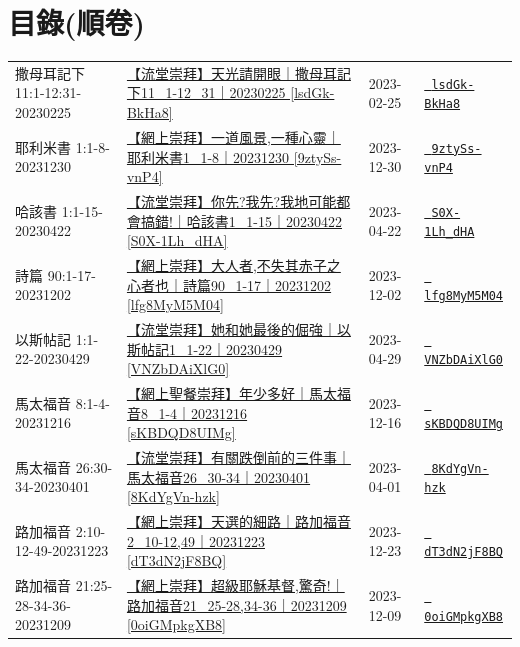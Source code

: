 \documentclass{book}
\begin{document}
\section{目錄\small{(順卷)}}
\label{sec:index_scriptual}
{ \scriptsize


\begin{xltabular}{\textwidth}{|p{0.15\textwidth} p{0.6\textwidth}|p{0.07\textwidth} p{0.1\textwidth}|}
\hline
撒母耳記下 11:1-12:31-20230225 & \hyperref[sec:lsdGk_BkHa8]{【流堂崇拜】天光請開眼｜撒母耳記下11\_1-12\_31｜20230225 [lsdGk-BkHa8]} & 2023-02-25 & \href{https://youtube.com/watch?v=lsdGk-BkHa8}{\texttt{ lsdGk-BkHa8}} \\
耶利米書 1:1-8-20231230 & \hyperref[sec:9ztySs_vnP4]{【網上崇拜】一道風景,一種心靈｜耶利米書1\_1-8｜20231230 [9ztySs-vnP4]} & 2023-12-30 & \href{https://youtube.com/watch?v=9ztySs-vnP4}{\texttt{ 9ztySs-vnP4}} \\
哈該書 1:1-15-20230422 & \hyperref[sec:S0X_1Lh_dHA]{【流堂崇拜】你先?我先?我地可能都會搞錯!｜哈該書1\_1-15｜20230422 [S0X-1Lh\_dHA]} & 2023-04-22 & \href{https://youtube.com/watch?v=S0X-1Lh_dHA}{\texttt{ S0X-1Lh\_dHA}} \\
詩篇 90:1-17-20231202 & \hyperref[sec:lfg8MyM5M04]{【網上崇拜】大人者,不失其赤子之心者也｜詩篇90\_1-17｜20231202 [lfg8MyM5M04]} & 2023-12-02 & \href{https://youtube.com/watch?v=lfg8MyM5M04}{\texttt{ lfg8MyM5M04}} \\
以斯帖記 1:1-22-20230429 & \hyperref[sec:VNZbDAiXlG0]{【流堂崇拜】她和她最後的倔強｜以斯帖記1\_1-22｜20230429 [VNZbDAiXlG0]} & 2023-04-29 & \href{https://youtube.com/watch?v=VNZbDAiXlG0}{\texttt{ VNZbDAiXlG0}} \\
馬太福音 8:1-4-20231216 & \hyperref[sec:sKBDQD8UIMg]{【網上聖餐崇拜】年少多好｜馬太福音8\_1-4｜20231216 [sKBDQD8UIMg]} & 2023-12-16 & \href{https://youtube.com/watch?v=sKBDQD8UIMg}{\texttt{ sKBDQD8UIMg}} \\
馬太福音 26:30-34-20230401 & \hyperref[sec:8KdYgVn_hzk]{【流堂崇拜】有關跌倒前的三件事｜馬太福音26\_30-34｜20230401 [8KdYgVn-hzk]} & 2023-04-01 & \href{https://youtube.com/watch?v=8KdYgVn-hzk}{\texttt{ 8KdYgVn-hzk}} \\
路加福音 2:10-12-49-20231223 & \hyperref[sec:dT3dN2jF8BQ]{【網上崇拜】天選的細路｜路加福音2\_10-12,49｜20231223 [dT3dN2jF8BQ]} & 2023-12-23 & \href{https://youtube.com/watch?v=dT3dN2jF8BQ}{\texttt{ dT3dN2jF8BQ}} \\
路加福音 21:25-28-34-36-20231209 & \hyperref[sec:0oiGMpkgXB8]{【網上崇拜】超級耶穌基督,驚奇!｜路加福音21\_25-28,34-36｜20231209 [0oiGMpkgXB8]} & 2023-12-09 & \href{https://youtube.com/watch?v=0oiGMpkgXB8}{\texttt{ 0oiGMpkgXB8}} \\

\end{xltabular}}
\end{document}
